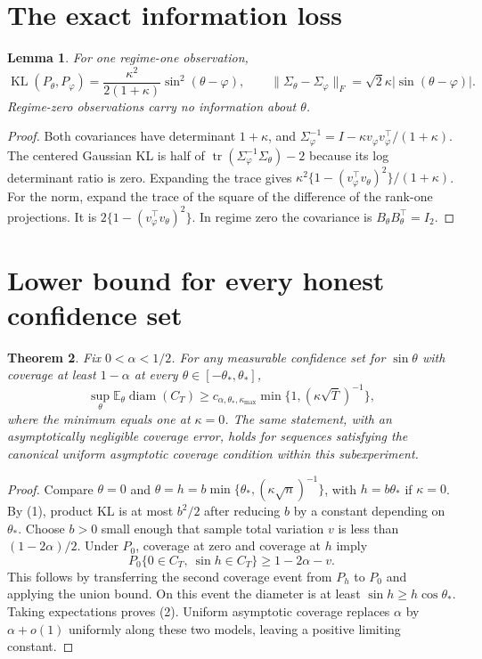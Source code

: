 \documentclass[11pt]{article}
\newtheorem{theorem}{Theorem}
\newtheorem{lemma}[theorem]{Lemma}
\theoremstyle{definition}
\begin{document}
\section*{The exact information loss}
\begin{lemma}
For one regime-one observation,
\[
 \operatorname{KL}(P_\theta,P_\varphi)
 =\frac{\kappa^2}{2(1+\kappa)}\sin^2(\theta-\varphi),\qquad
 \|\Sigma_\theta-\Sigma_\varphi\|_F
 =\sqrt2\kappa|\sin(\theta-\varphi)|.                    \tag{1}
\]
Regime-zero observations carry no information about $\theta$.
\end{lemma}
\begin{proof}
Both covariances have determinant $1+\kappa$, and
$\Sigma_\varphi^{-1}=I-\kappa v_\varphi v_\varphi^\top/(1+\kappa)$.
The centered Gaussian KL is half of
$\operatorname{tr}(\Sigma_\varphi^{-1}\Sigma_\theta)-2$ because
its log determinant ratio is zero. Expanding the trace gives
$\kappa^2\{1-(v_\varphi^\top v_\theta)^2\}/(1+\kappa)$.
For the norm, expand the trace of the square of the difference of the
rank-one projections. It is $2\{1-(v_\varphi^\top v_\theta)^2\}$.
In regime zero the covariance is $B_\theta B_\theta^\top=I_2$.
\end{proof}

\section*{Lower bound for every honest confidence set}
\begin{theorem}
Fix $0<\alpha<1/2$. For any measurable confidence set for $\sin\theta$
with coverage at least $1-\alpha$ at every $\theta\in[-\theta_*,\theta_*]$,
\[
 \sup_\theta\mathbb E_\theta\operatorname{diam}(C_T)
 \ge c_{\alpha,\theta_*,\kappa_{\max}}
          \min\{1,(\kappa\sqrt T)^{-1}\},                \tag{2}
\]
where the minimum equals one at $\kappa=0$.
The same statement, with an asymptotically negligible coverage error,
holds for sequences satisfying the canonical uniform asymptotic coverage
condition within this subexperiment.
\end{theorem}
\begin{proof}
Compare $\theta=0$ and
$\theta=h=b\min\{\theta_*,(\kappa\sqrt n)^{-1}\}$, with $h=b\theta_*$
if $\kappa=0$. By (1), product KL is at most $b^2/2$ after reducing $b$
by a constant depending on $\theta_*$. Choose $b>0$ small enough that
sample total variation $v$ is less than $(1-2\alpha)/2$.
Under $P_0$, coverage at zero and coverage at $h$ imply
\[
 P_0\{0\in C_T,\ \sin h\in C_T\}\ge1-2\alpha-v.
\]
This follows by transferring the second coverage event from $P_h$ to
$P_0$ and applying the union bound. On this event the diameter is at
least $\sin h\ge h\cos\theta_*$. Taking expectations proves (2).
Uniform asymptotic coverage replaces $\alpha$ by $\alpha+o(1)$ uniformly
along these two models, leaving a positive limiting constant.
\end{proof}
\end{document}
